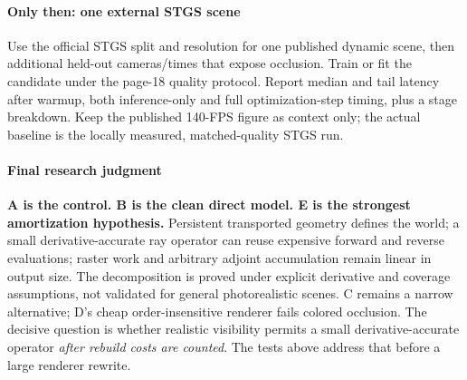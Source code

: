 \documentclass[11pt,letterpaper]{article}
\newcommand{\mini}[1]{\paragraph{#1}}
\begin{document}
\mini{Only then: one external STGS scene}
Use the official STGS split and resolution for one published dynamic scene, then additional held-out cameras/times that expose occlusion. Train or fit the candidate under the page-18 quality protocol. Report median and tail latency after warmup, both inference-only and full optimization-step timing, plus a stage breakdown. Keep the published 140-FPS figure as context only; the actual baseline is the locally measured, matched-quality STGS run. 

\mini{Final research judgment}
\textbf{A is the control. B is the clean direct model. E is the strongest amortization hypothesis.} Persistent transported geometry defines the world; a small derivative-accurate ray operator can reuse expensive forward and reverse evaluations; raster work and arbitrary adjoint accumulation remain linear in output size. The decomposition is proved under explicit derivative and coverage assumptions, not validated for general photorealistic scenes. C remains a narrow alternative; D's cheap order-insensitive renderer fails colored occlusion. The decisive question is whether realistic visibility permits a small derivative-accurate operator \emph{after rebuild costs are counted}. The tests above address that before a large renderer rewrite.

\newpage
\end{document}
